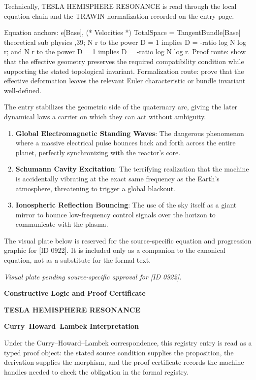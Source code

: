 Technically, TESLA HEMISPHERE RESONANCE is read through the local equation chain and the TRAWIN normalization recorded on the entry page.

Equation anchors: e[Base], (* Velocities *) TotalSpace = TangentBundle[Base] theoretical sub physics ,39; N r to the power D = 1 implies D = -ratio log N log r; and N r to the power D = 1 implies D = -ratio log N log r. Proof route: show that the effective geometry preserves the required compatibility condition while supporting the stated topological invariant. Formalization route: prove that the effective deformation leaves the relevant Euler characteristic or bundle invariant well-defined.

The entry stabilizes the geometric side of the quaternary arc, giving the later dynamical laws a carrier on which they can act without ambiguity.
\endgroup

\begin{enumerate}[leftmargin=1.6em,itemsep=6pt,topsep=4pt]
\item \textbf{Global Electromagnetic Standing Waves}: The dangerous phenomenon where a massive electrical pulse bounces back and forth across the entire planet, perfectly synchronizing with the reactor's core.
\item \textbf{Schumann Cavity Excitation}: The terrifying realization that the machine is accidentally vibrating at the exact same frequency as the Earth's atmosphere, threatening to trigger a global blackout.
\item \textbf{Ionospheric Reflection Bouncing}: The use of the sky itself as a giant mirror to bounce low-frequency control signals over the horizon to communicate with the plasma.
\end{enumerate}

\begingroup\footnotesize\sloppy
The visual plate below is reserved for the source-specific equation and progression graphic for [ID 0922]. It is included only as a companion to the canonical equation, not as a substitute for the formal text.
\par\endgroup
\begingroup\footnotesize\itshape
Visual plate pending source-specific approval for [ID 0922].
\par\endgroup

\clearpage
\begingroup\tzpsupportsetup
\noindent\textbf{\fontsize{10.8pt}{12.8pt}\selectfont [ID 0922] Constructive Logic and Proof Certificate}\par
\noindent\textbf{\fontsize{10pt}{12pt}\selectfont TESLA HEMISPHERE RESONANCE}\par
\vspace{0.45em}
\begingroup
\footnotesize
\setlength{\parskip}{0.22em}
\setlength{\parindent}{0pt}
\noindent\textbf{Curry--Howard--Lambek Interpretation}\par
Under the Curry--Howard--Lambek correspondence, this registry entry is read as a typed proof
object: the stated source condition supplies the proposition, the derivation supplies the
morphism, and the proof certificate records the machine handles needed to check the obligation
in the formal registry.

